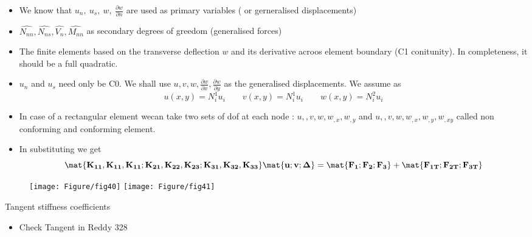 	\begin{frame}
		\begin{itemize}
			\item We know that $u_n,~u_s,~w,~\frac{\partial w}{\partial n}$ are used as primary variables ( or gerneralised displacements)
			\item $\hat{N_{nn}},\hat{N_{ns}},\hat{V_{n}},\hat{M_{nn}}$ as secondary degrees of greedom (generalised forces)
			\item The finite elements based on the transverse deflection $w$ and its derivative acroos element boundary (C1 conitunity). In completeness, it should be a full quadratic.
			\item $u_n$ and $u_s$ need only be C0. We shall use $u,v,w,\frac{\partial w}{\partial x}, \frac{\partial w}{\partial y}$ as the generalised displacements. We assume as
			\begin{equation}
			u(x,y) =N_i^1u_i \qquad v(x,y)=N_i^1u_i \qquad w(x,y) = N_i^2u_i
			\end{equation}
			\item In case of a rectangular element wecan take two sets of dof at each node : $u,,v,w,w_{,x},w_{,y}$ and $u,,v,w,w_{,x},w_{,y}, w_{,xy}$ called non conforming and conforming element. 
			\item  In substituting we get
			\begin{equation}
				\ve{\mat{K_{11},K_{11},K_{11};K_{21},K_{22},K_{23};K_{31},K_{32},K_{33}} \mat{u;v;\Delta} = \mat{F_1;F_2;F_3} + \mat{F_{1T};F_{ 2T};F_{3T}} }
			\end{equation}
			
		\end{itemize}
	\end{frame}


	\begin{frame}
		\begin{figure}
			\centering
			\texttt{[image: Figure/fig40]}  		
			\texttt{[image: Figure/fig41]}
		\end{figure}
	\end{frame}


	\begin{frame}{Tangent stiffness coefficients}
		\begin{itemize}
			\item Check Tangent in Reddy 328
		\end{itemize}
	\end{frame}


